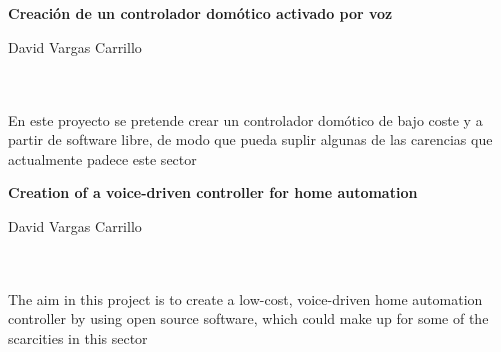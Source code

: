 \chapter*{}




\cleardoublepage
\thispagestyle{empty}

\begin{center}
{\large\bfseries Creación de un controlador domótico activado por voz}\\
\end{center}
\begin{center}
David Vargas Carrillo\\
\end{center}

\\

\vspace{0.7cm}
\\

En este proyecto se pretende crear un controlador domótico de bajo coste y a partir de software libre, de modo 
que pueda suplir algunas de las carencias que actualmente padece este sector

\cleardoublepage


\thispagestyle{empty}


\begin{center}
{\large\bfseries Creation of a voice-driven controller for home automation}\\
\end{center}
\begin{center}
David Vargas Carrillo\\
\end{center}

\\

\vspace{0.7cm}
\\

The aim in this project is to create a low-cost, voice-driven home automation controller by using open source
software, which could make up for some of the scarcities in this sector

